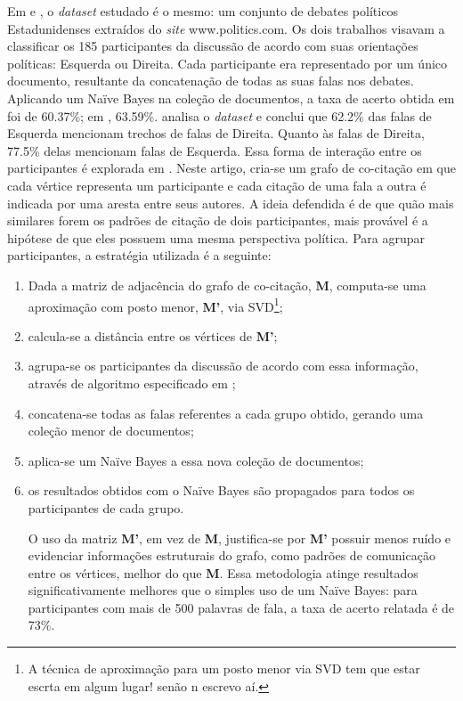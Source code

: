 Em \cite{malouf-taking_sides} e \cite{aaai-politcs}, o \emph{dataset} estudado é o mesmo: um conjunto de debates políticos Estadunidenses extraídos do \emph{site} www.politics.com. Os dois trabalhos visavam a classificar os 185 participantes da discussão de acordo com suas orientações políticas: Esquerda ou Direita. Cada participante era representado por um único documento, resultante da concatenação de todas as suas falas nos debates. Aplicando um Naïve Bayes na coleção de documentos, a taxa de acerto obtida em \cite{aaai-politics} foi de 60.37\%; em \cite{malouf-takind_sides}, 63.59\%. \cite{aaai-politcs} analisa o \emph{dataset} e conclui que 62.2\% das falas de Esquerda mencionam trechos de falas de Direita. Quanto às falas de Direita, 77.5\% delas mencionam falas de Esquerda. Essa forma de interação entre os participantes é explorada em \cite{malouf-taking_sides}. Neste artigo, cria-se um grafo de co-citação em que cada vértice representa um participante e cada citação de uma fala a outra é indicada por uma aresta entre seus autores. A ideia defendida é de que quão mais similares forem os padrões de citação de dois participantes, mais provável é a hipótese de que eles possuem uma mesma perspectiva política. Para agrupar participantes, a estratégia utilizada é a seguinte:

\begin{enumerate}
  \item Dada a matriz de adjacência do grafo de co-citação, \textbf{M}, computa-se uma aproximação com posto menor, \textbf{M'}, via SVD\footnote{A técnica de aproximação para um posto menor via SVD tem que estar escrta em algum lugar! senão n escrevo aí.};
  \item calcula-se a distância entre os vértices de \textbf{M'};
  \item agrupa-se os participantes da discussão de acordo com essa informação, através de algoritmo especificado em \cite{hoon};
  \item concatena-se todas as falas referentes a cada grupo obtido, gerando uma coleção menor de documentos;
  \item aplica-se um Naïve Bayes a essa nova coleção de documentos;
  \item os resultados obtidos com o Naïve Bayes são propagados para todos os participantes de cada grupo.

O uso da matriz \textbf{M'}, em vez de \textbf{M}, justifica-se por \textbf{M'} possuir menos ruído e evidenciar informações estruturais do grafo, como padrões de comunicação entre os vértices, melhor do que \textbf{M}\cite{drineas}. Essa metodologia atinge resultados significativamente melhores que o simples uso de um Naïve Bayes: para participantes com mais de 500 palavras de fala, a taxa de acerto relatada é de 73\%.
\end{enumerate}

